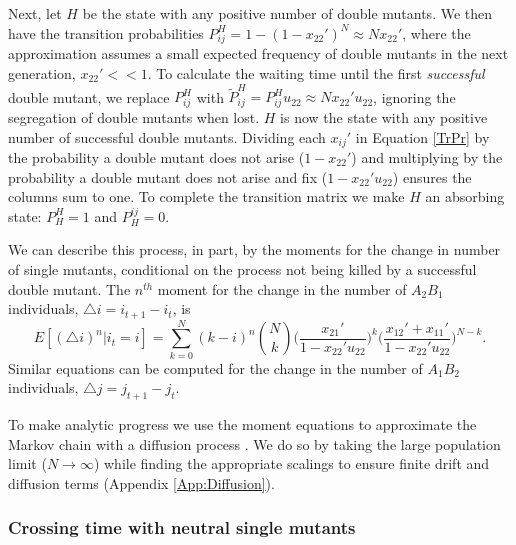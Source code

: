 \documentclass[review,3p,authoryear]{elsarticle}
\begin{document}
Next, let $H$ be the state with any positive number of double mutants. 
We then have the transition probabilities $P_{ij}^H = 1-(1-x_{22}')^N \approx N x_{22}'$, where the approximation assumes a small expected frequency of double mutants in the next generation, $x_{22}'<<1$.
To calculate the waiting time until the first \textit{successful} double mutant, we replace $P_{ij}^H$ with $\tilde{P}_{ij}^H = P_{ij}^H u_{22} \approx N x_{22}' u_{22}$, ignoring the segregation of double mutants when lost.
$H$ is now the state with any positive number of successful double mutants. 
Dividing each $x_{ij}'$ in Equation \eqref{TrPr} by the probability a double mutant does not arise ($1-x_{22}'$) and multiplying by the probability a double mutant does not arise and fix ($1-x_{22}'u_{22}$) ensures the columns sum to one.
To complete the transition matrix we make $H$  an absorbing state: $P_H^H=1$ and $P_H^{ij}=0$.

We can describe this process, in part, by the moments for the change in number of single mutants, conditional on the process not being killed by a successful double mutant.
The $n^{th}$ moment for the change in the number of $A_2B_1$ individuals, $\triangle i = i_{t+1} - i_t$, is
\begin{equation}\label{Din}
E[ (\triangle i)^n | i_t = i ] = \sum_{k=0}^{N} (k - i)^n \binom{N}{k} \Big(\frac{x_{21}'}{1-x_{22}'u_{22}}\Big)^k \Big(\frac{x_{12}' + x_{11}'}{1-x_{22}'u_{22}}\Big)^{N-k}.
\end{equation}
Similar equations can be computed for the change in the number of $A_1B_2$ individuals, $\triangle j = j_{t+1} - j_t$.

To make analytic progress we use the moment equations to approximate the Markov chain with a diffusion process \citep[][Ch. 15]{Karlin1981book}.
We do so by taking the large population limit ($N \rightarrow \infty$) while finding the appropriate scalings to ensure finite drift and diffusion terms (Appendix \ref{App:Diffusion}).

\subsubsection{Crossing time with neutral single mutants}
\end{document}
